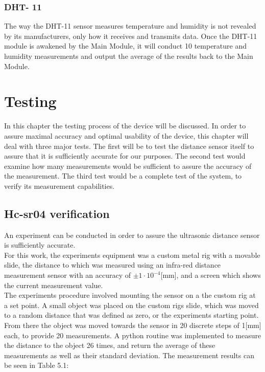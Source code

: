 \documentclass[twoside]{ctuthesis}
\theoremstyle{plain}
\theoremstyle{definition}
\theoremstyle{note}
\begin{document}
\subsection{DHT- 11}
The way the DHT-11 sensor measures temperature and humidity is not revealed by its manufacturers, only how it receives and transmits data. Once the DHT-11 module is awakened by the Main Module, it will conduct 10 temperature and humidity measurements and output the average of the results back to the Main Module.

\newpage

\pagebreak 

\begingroup
\renewcommand{\cleardoublepage}{}
\renewcommand{\clearpage}{}
\chapter{Testing}
\endgroup
In this chapter the testing process of the device will be discussed. In order to assure maximal accuracy and optimal usability of the device, this chapter will deal with three major tests. The first will be to test the distance sensor itself to assure that it is sufficiently accurate for our purposes. The second test would examine how many measurements would be sufficient to assure the accuracy of the measurement. The third test would be a complete test of the system, to verify its measurement capabilities.

\section{Hc-sr04 verification}
An experiment can be conducted in order to assure the ultrasonic distance sensor is sufficiently accurate.\\ 
For this work, the experiments equipment was a custom metal rig with a movable slide, the distance to which was measured using an infra-red distance measurement sensor with an accuracy of $\pm1\cdot10^{-4}$[mm], and a screen which shows the current measurement value.\\
The experiments procedure involved mounting the sensor on a the custom rig at a set point. A small object was placed on the custom rigs slide, which was moved to a random distance that was defined as zero, or the experiments starting point. From there the object was moved towards the sensor in 20 discrete steps of 1[mm] each, to provide 20 measurements. A python routine was implemented to measure the distance to the object 26 times, and return the average of these measurements as well as their standard deviation. The measurement results can be seen in Table 5.1:
\end{document}
